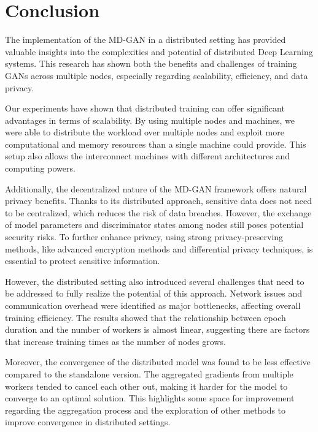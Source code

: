 \chapter{Conclusion}
The implementation of the MD-GAN in a distributed setting has provided valuable insights into the complexities and potential of distributed Deep Learning systems. This research has shown both the benefits and challenges of training GANs across multiple nodes, especially regarding scalability, efficiency, and data privacy.

Our experiments have shown that distributed training can offer significant advantages in terms of scalability. By using multiple nodes and machines, we were able to distribute the workload over multiple nodes and exploit more computational and memory resources than a single machine could provide. This setup also allows the interconnect machines with different architectures and computing powers.


Additionally, the decentralized nature of the MD-GAN framework offers natural privacy benefits. Thanks to its distributed approach, sensitive data does not need to be centralized, which reduces the risk of data breaches. However, the exchange of model parameters and discriminator states among nodes still poses potential security risks. To further enhance privacy, using strong privacy-preserving methods, like advanced encryption methods and differential privacy techniques, is essential to protect sensitive information.


However, the distributed setting also introduced several challenges that need to be addressed to fully realize the potential of this approach. Network issues and communication overhead were identified as major bottlenecks, affecting overall training efficiency. The results showed that the relationship between epoch duration and the number of workers is almost linear, suggesting there are factors that increase training times as the number of nodes grows.

Moreover, the convergence of the distributed model was found to be less effective compared to the standalone version. The aggregated gradients from multiple workers tended to cancel each other out, making it harder for the model to converge to an optimal solution. This highlights some space for improvement regarding the aggregation process and the exploration of other methods to improve convergence in distributed settings.

